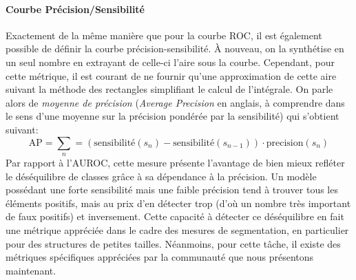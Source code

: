\paragraph{Courbe Précision/Sensibilité} Exactement de la même manière que pour la courbe ROC, il est également possible de définir la courbe précision-sensibilité. À nouveau, on la synthétise en un seul nombre en extrayant de celle-ci l'aire sous la courbe. Cependant, pour cette métrique, il est courant de ne fournir qu'une approximation de cette aire suivant la méthode des rectangles simplifiant le calcul de l'intégrale. On parle alors de \textit{moyenne de précision} (\textit{Average Precision} en anglais, à comprendre dans le sens d'une moyenne sur la précision pondérée par la sensibilité) qui s'obtient suivant:
\begin{equation}
	\text{AP}  = \sum_n  = (\text{sensibilité}(s_n) - \text{sensibilité}(s_{n-1})) \cdot \text{precision}(s_n)
\end{equation}
Par rapport à l'AUROC, cette mesure présente l'avantage de bien mieux refléter le déséquilibre de classes grâce à sa dépendance à la précision. Un modèle possédant une forte sensibilité mais une faible précision tend à trouver tous les éléments positifs, mais au prix d'en détecter trop (d'où un nombre très important de faux positifs) et inversement. Cette capacité à détecter ce déséquilibre en fait une métrique appréciée dans le cadre des mesures de segmentation, en particulier pour des structures de petites tailles. Néanmoins, pour cette tâche, il existe des métriques spécifiques appréciées par la communauté que nous présentons maintenant.

